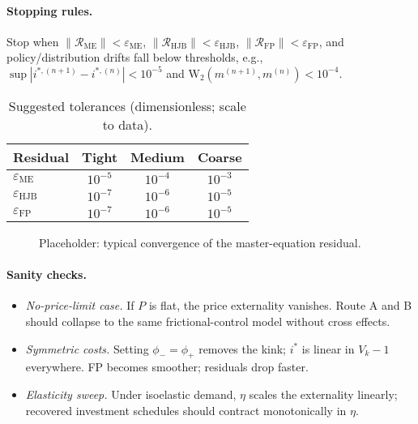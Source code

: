 ﻿\documentclass[11pt,letterpaper,oneside]{article}
\numberwithin{equation}{section}
\newcommand{\1}{\mathbf{1}}
\begin{document}
\paragraph{Stopping rules.}
Stop when $\|\mathcal{R}_{\mathrm{ME}}\|<\varepsilon_{\mathrm{ME}}$, $\|\mathcal{R}_{\mathrm{HJB}}\|<\varepsilon_{\mathrm{HJB}}$, $\|\mathcal{R}_{\mathrm{FP}}\|<\varepsilon_{\mathrm{FP}}$, and policy/distribution drifts fall below thresholds, e.g., $\sup|i^{*,(n+1)}-i^{*,(n)}|<10^{-5}$ and $\mathrm{W}_2(m^{(n+1)},m^{(n)})<10^{-4}$.

\begin{table}[ht]
\centering
\small
\begin{tabular}{@{}lccc@{}}
\toprule
Residual & Tight & Medium & Coarse \\
\midrule
$\varepsilon_{\mathrm{ME}}$ & $10^{-5}$ & $10^{-4}$ & $10^{-3}$ \\
$\varepsilon_{\mathrm{HJB}}$ & $10^{-7}$ & $10^{-6}$ & $10^{-5}$ \\
$\varepsilon_{\mathrm{FP}}$  & $10^{-7}$ & $10^{-6}$ & $10^{-5}$ \\
\bottomrule
\end{tabular}
\caption{Suggested tolerances (dimensionless; scale to data).}
\end{table}

\begin{figure}[ht]
\centering
{}
\caption{Placeholder: typical convergence of the master-equation residual.}
\end{figure}

\paragraph{Sanity checks.}
\begin{itemize}[leftmargin=1.25em]
\item \emph{No-price-limit case.} If $P$ is flat, the price externality vanishes. Route A and B should collapse to the same frictional-control model without cross effects.
\item \emph{Symmetric costs.} Setting $\phi_-=\phi_+$ removes the kink; $i^*$ is linear in $V_k-1$ everywhere. FP becomes smoother; residuals drop faster.
\item \emph{Elasticity sweep.} Under isoelastic demand, $\eta$ scales the externality linearly; recovered investment schedules should contract monotonically in $\eta$.
\end{itemize}
\end{document}
